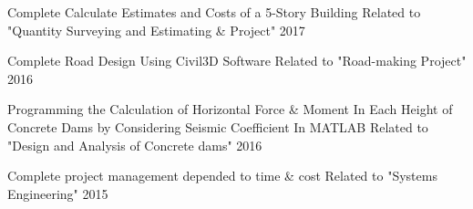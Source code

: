 \begin{cvhonors}
\vspace{10pt}    
  \cvhonor
    {Complete Calculate Estimates and Costs of a 5-Story Building} %
    {Related to "Quantity Surveying and Estimating \& Project"} %
    {} %
    {2017} %
    
\vspace{10pt}   
  \cvhonor
    {Complete Road Design Using Civil3D Software} %
    {Related to "Road-making Project"} %
    {} %
    {2016} %

\vspace{10pt}  
  \cvhonor
    {Programming the Calculation of Horizontal Force \& Moment In Each Height of Concrete Dams by Considering Seismic Coefficient In MATLAB} %
    {Related to "Design and Analysis of Concrete dams"} %
    {} %
    {2016} %
    
\vspace{10pt}
  \cvhonor
    {Complete project management depended to time \& cost} %
    {Related to "Systems Engineering"} %
    {} %
    {2015} %
    

\end{cvhonors}


    {} %
    {} %
    {} %
    {} %